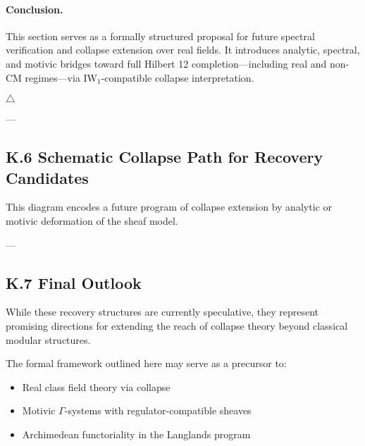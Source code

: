 \documentclass[11pt]{article}
\begin{document}
\paragraph{Conclusion.}

This section serves as a formally structured proposal for future spectral verification and collapse extension over real fields.  
It introduces analytic, spectral, and motivic bridges toward full Hilbert 12 completion—including real and non-CM regimes—via IW$_1$-compatible collapse interpretation.

\hfill \( \triangle \)

---

\subsection*{K.6 Schematic Collapse Path for Recovery Candidates}

\begin{center}
\end{center}

This diagram encodes a future program of collapse extension by analytic or motivic deformation of the sheaf model.

---

\subsection*{K.7 Final Outlook}

While these recovery structures are currently speculative, they represent promising directions for extending the reach of collapse theory beyond classical modular structures.

The formal framework outlined here may serve as a precursor to:

\begin{itemize}
  \item Real class field theory via collapse
  \item Motivic \( \Gamma \)-systems with regulator-compatible sheaves
  \item Archimedean functoriality in the Langlands program
\end{itemize}
\end{document}
